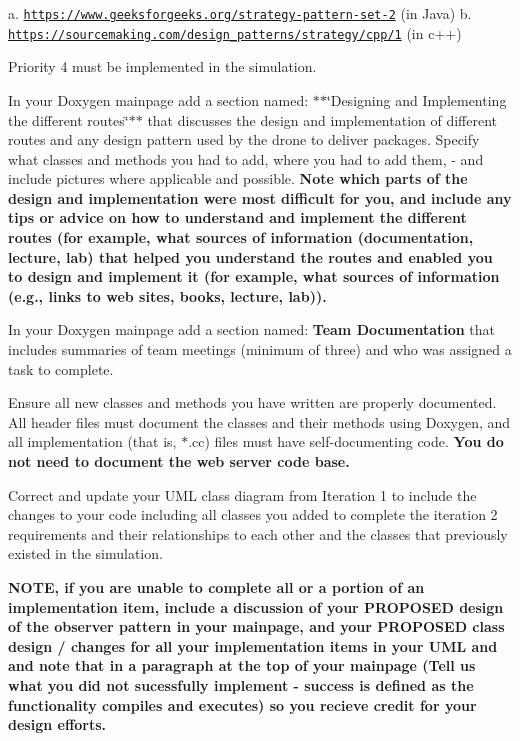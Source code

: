 a. \href{https://www.geeksforgeeks.org/strategy-pattern-set-2}{\tt https\+://www.\+geeksforgeeks.\+org/strategy-\/pattern-\/set-\/2} (in Java) b. \href{https://sourcemaking.com/design_patterns/strategy/cpp/1}{\tt https\+://sourcemaking.\+com/design\+\_\+patterns/strategy/cpp/1} (in c++)


\begin{DoxyEnumerate}
\item Priority 4 must be implemented in the simulation.
\item In your Doxygen mainpage add a section named\+: $\ast$$\ast$\char`\"{}\+Designing and Implementing the different routes\char`\"{}$\ast$$\ast$ that discusses the design and implementation of different routes and any design pattern used by the drone to deliver packages. Specify what classes and methods you had to add, where you had to add them, -\/ and include pictures where applicable and possible. {\bfseries Note which parts of the design and implementation were most difficult for you, and include any tips or advice on how to understand and implement the different routes (for example, what sources of information (documentation, lecture, lab) that helped you understand the routes and enabled you to design and implement it (for example, what sources of information (e.\+g., links to web sites, books, lecture, lab)).}
\item In your Doxygen mainpage add a section named\+: {\bfseries Team Documentation} that includes summaries of team meetings (minimum of three) and who was assigned a task to complete.
\item Ensure all new classes and methods you have written are properly documented. All header files must document the classes and their methods using Doxygen, and all implementation (that is, $\ast$.cc) files must have self-\/documenting code. {\bfseries You do not need to document the web server code base.}
\item Correct and update your U\+ML class diagram from Iteration 1 to include the changes to your code including all classes you added to complete the iteration 2 requirements and their relationships to each other and the classes that previously existed in the simulation.
\end{DoxyEnumerate}

{\bfseries N\+O\+TE, if you are unable to complete all or a portion of an implementation item, include a discussion of your P\+R\+O\+P\+O\+S\+ED design of the observer pattern in your mainpage, and your P\+R\+O\+P\+O\+S\+ED class design / changes for all your implementation items in your U\+ML and and note that in a paragraph at the top of your mainpage (Tell us what you did not sucessfully implement -\/ success is defined as the functionality compiles and executes) so you recieve credit for your design efforts.}

